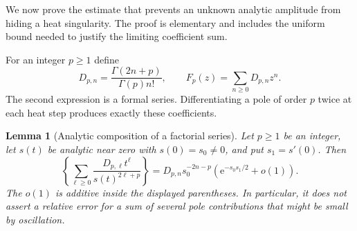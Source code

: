 \documentclass[11pt,a4paper]{article}
\numberwithin{equation}{section}
\newtheorem{lemma}[theorem]{Lemma}
\theoremstyle{definition}
\theoremstyle{remark}
\newcommand{\ee}{\mathrm e}
\newcommand{\coef}[2]{[#1^{#2}]}
\begin{document}
We now prove the estimate that prevents an unknown analytic amplitude
from hiding a heat singularity.  The proof is elementary and includes
the uniform bound needed to justify the limiting coefficient sum.

For an integer $p\ge1$ define
\begin{equation}
 D_{p,n}=\frac{\Gamma(2n+p)}{\Gamma(p)n!},\qquad
 F_p(z)=\sum_{n\ge0}D_{p,n}z^n.
 \label{eq:Dpn}
\end{equation}
The second expression is a formal series.  Differentiating a pole of
order $p$ twice at each heat step produces exactly these coefficients.

\begin{lemma}[Analytic composition of a factorial series]
\label{lem:composition}
Let $p\ge1$ be an integer, let $s(t)$ be analytic near zero with
$s(0)=s_0\ne0$, and put $s_1=s'(0)$.  Then
\begin{equation}
 \coef{t}{n}\left\{
  \sum_{\ell\ge0}\frac{D_{p,\ell}t^\ell}{s(t)^{2\ell+p}}
 \right\}
 =D_{p,n}s_0^{-2n-p}
       \left(\ee^{-s_0s_1/2}+o(1)\right).
 \label{eq:pole-transfer}
\end{equation}
The $o(1)$ is additive inside the displayed parentheses.  In particular,
it does not assert a relative error for a sum of several pole
contributions that might be small by oscillation.
\end{lemma}
\end{document}
